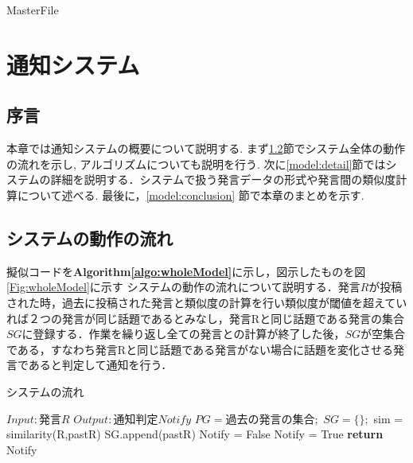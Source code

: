 \expandafter\ifx\csname MasterFile\endcsname\relax
	\def\SubFile{hoge}
  
  
	\setcounter{chapter}{2}
  \fi
  \cleardoublepage
\chapter{通知システム}
%
\label{model:chapter}

\section{序言}
\label{model:introduction}
本章では通知システムの概要について説明する. まず\ref{model:wholeModel}節でシステム全体の動作の流れを示し, アルゴリズムについても説明を行う. 次に\ref{model:detail}節ではシステムの詳細を説明する．システムで扱う発言データの形式や発言間の類似度計算について述べる. 
最後に，\ref{model:conclusion} 節で本章のまとめを示す.

\section{システムの動作の流れ}
\label{model:wholeModel}
擬似コードを\textbf{Algorithm\ref{algo:wholeModel}}に示し，図示したものを図\ref{Fig:wholeModel}に示す
システムの動作の流れについて説明する．発言$R$が投稿された時，過去に投稿された発言と類似度の計算を行い類似度が閾値を超えていれば２つの発言が同じ話題であるとみなし，発言Rと同じ話題である発言の集合$SG$に登録する．作業を繰り返し全ての発言との計算が終了した後，$SG$が空集合である，すなわち発言Rと同じ話題である発言がない場合に話題を変化させる発言であると判定して通知を行う．
\begin{algorithm}
\caption{システムの流れ} \label{algo:wholeModel}
\begin{algorithmic}[1]
	\State $Input:  発言R$
	\State $Output: 通知判定Notify$
	\State $PG = 過去の発言の集合;$%
	\State $SG = \{\};$%
	 \label{algo:wholeModel:for1-b}
	 	\State sim = similarity(R,pastR)
			\State SG.append(pastR)
		\EndIf
	 \EndFor\label{algo:wholeModel:for1-e}
	 \State Notify = False
		\State Notify = True
	\EndIf
	\State \textbf{return} Notify
\end{algorithmic}
\end{algorithm}

